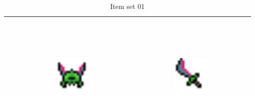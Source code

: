 \begin{table}[h!]
\begin{center}
\begin{tabular}{ | c | c | c | }
    & 
    \includegraphics[width=0.3\textwidth, height=60mm]{images/Entity_Helmet_02.png}    
    & 
    \includegraphics[width=0.3\textwidth, height=60mm]{images/Entity_Weapon_02.png}
    \\
    \hline
    \end{tabular}
    \caption{Item set 01}
    \label{tbl:Equipable items}
    \end{center}
\end{table}

